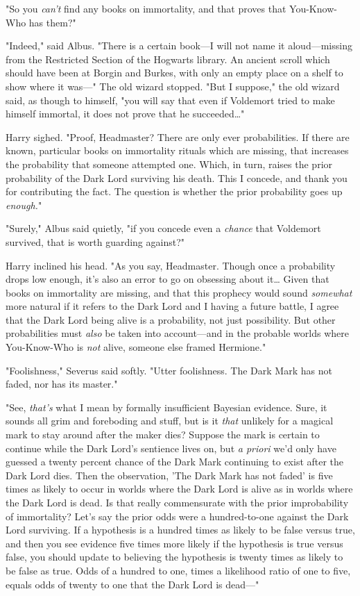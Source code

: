 "So you \emph{can't} find any books on immortality, and that proves that 
You-Know-Who has them?"

"Indeed," said Albus. "There is a certain book---I will not name it 
aloud---missing from the Restricted Section of the Hogwarts library. An ancient 
scroll which should have been at Borgin and Burkes, with only an empty place on 
a shelf to show where it was---" The old wizard stopped. "But I suppose," the 
old wizard said, as though to himself, "you will say that even if Voldemort 
tried to make himself immortal, it does not prove that he succeeded{\ldots}"

Harry sighed. "Proof, Headmaster? There are only ever probabilities. If there 
are known, particular books on immortality rituals which are missing, that 
increases the probability that someone attempted one. Which, in turn, raises 
the prior probability of the Dark Lord surviving his death. This I concede, and 
thank you for contributing the fact. The question is whether the prior 
probability goes up \emph{enough.}"

"Surely," Albus said quietly, "if you concede even a \emph{chance} that 
Voldemort survived, that is worth guarding against?"

Harry inclined his head. "As you say, Headmaster. Though once a probability 
drops low enough, it's also an error to go on obsessing about it{\ldots} Given 
that books on immortality are missing, and that this prophecy would sound 
\emph{somewhat} more natural if it refers to the Dark Lord and I having a 
future battle, I agree that the Dark Lord being alive is a probability, not 
just possibility. But other probabilities must \emph{also} be taken into 
account---and in the probable worlds where You-Know-Who is \emph{not} alive, 
someone else framed Hermione."

"Foolishness," Severus said softly. "Utter foolishness. The Dark Mark has not 
faded, nor has its master."

"See, \emph{that's} what I mean by formally insufficient Bayesian evidence. 
Sure, it sounds all grim and foreboding and stuff, but is it \emph{that} 
unlikely for a magical mark to stay around after the maker dies? Suppose the 
mark is certain to continue while the Dark Lord's sentience lives on, but 
\emph{a priori} we'd only have guessed a twenty percent chance of the Dark Mark 
continuing to exist after the Dark Lord dies. Then the observation, 'The Dark 
Mark has not faded' is five times as likely to occur in worlds where the Dark 
Lord is alive as in worlds where the Dark Lord is dead. Is that really 
commensurate with the prior improbability of immortality? Let's say the prior 
odds were a hundred-to-one against the Dark Lord surviving. If a hypothesis is 
a hundred times as likely to be false versus true, and then you see evidence 
five times more likely if the hypothesis is true versus false, you should 
update to believing the hypothesis is twenty times as likely to be false as 
true. Odds of a hundred to one, times a likelihood ratio of one to five, equals 
odds of twenty to one that the Dark Lord is dead---"

